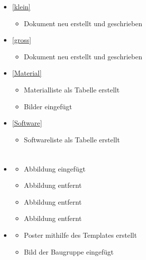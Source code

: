\begin{itemize}
 	\item {}\ref{klein}
 	\begin{itemize}
 		\item Dokument neu erstellt und geschrieben
 	\end{itemize}
 	
 	\item {}\ref{gross}
 	\begin{itemize}
 		\item Dokument neu erstellt und geschrieben
 	\end{itemize}
 	
 	 	\item {}\ref{Material}
 	\begin{itemize}
 		\item Materialliste als Tabelle erstellt
 		\item Bilder eingefügt
 	\end{itemize}
 	
 	 	\item {}\ref{Software}
 	\begin{itemize}
 		\item Softwareliste als Tabelle erstellt
 	\end{itemize}
    \end{itemize}



	
\section{}
    \begin{itemize}
    \item {}
	    \begin{itemize}
		\item Abbildung  eingefügt
		\item Abbildung  entfernt
		\item Abbildung  entfernt
		\item Abbildung  entfernt
    	\end{itemize}
    \item {}
        \begin{itemize}
     	\item Poster mithilfe des Templates erstellt
     	\item Bild der Baugruppe eingefügt
        \end{itemize}
	\end{itemize}
		
